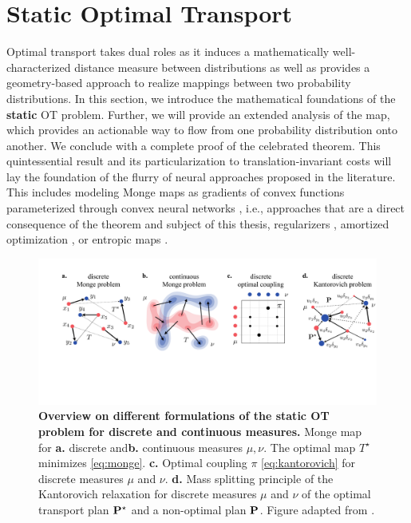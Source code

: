 \section{Static Optimal Transport} \label{sec:background_ot_static}

 Optimal transport takes dual roles as it induces a mathematically well-characterized distance measure between distributions as well as provides a geometry-based approach to realize mappings between two probability distributions.
In this section, we introduce the mathematical foundations of the \textbf{static} OT problem. Further, we will provide an extended analysis of the \citeauthor{monge1781histoire} map, which provides an actionable way to flow from one probability distribution onto another.
We conclude with a complete proof of the celebrated \citeauthor{brenier1987decomposition} theorem. This quintessential result and its particularization to translation-invariant costs will lay the foundation of the flurry of neural approaches proposed in the literature. This includes modeling Monge maps as gradients of convex functions parameterized through convex neural networks \citep{amos2017input, huang2021convex, makkuva2020optimal, korotin2021neural, lubeck2022neural, bunne2022supervised}, i.e., approaches that are a direct consequence of the \citeauthor{brenier1987decomposition} theorem and subject of this thesis, regularizers \citep{uscidda2023monge}, amortized optimization \citep{amos2022amortizing, amos2022meta}, or entropic maps \citep{pooladian2021entropic, pooladian2023minimax, divol2022optimal, cuturi2023monge}.

\begin{figure}[t]
  \includegraphics[width=\textwidth]{figures/fig_ot_background.pdf}
  \caption{\textbf{Overview on different formulations of the static OT problem for discrete and continuous measures.} Monge map for \textbf{a.} discrete and\textbf{b.} continuous measures $\mu, \nu$. The optimal map $T^\star$ minimizes \eqref{eq:monge}. \textbf{c.} Optimal coupling $\pi$ \eqref{eq:kantorovich} for discrete measures $\mu$ and $\nu$. \textbf{d.} Mass splitting principle of the Kantorovich relaxation for discrete measures $\mu$ and $\nu$ of the optimal transport plan $\mathbf{P}^\star$ and a non-optimal plan $\mathbf{P}$. Figure adapted from \citet{peyre2019computational}.}	
  \label{fig:ot_principles}
\end{figure}

